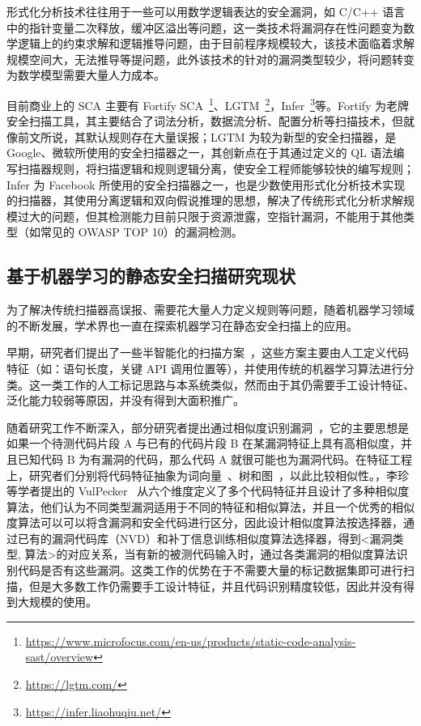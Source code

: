 形式化分析技术往往用于一些可以用数学逻辑表达的安全漏洞，如 C/C++ 语言中的指针变量二次释放，缓冲区溢出等问题，这一类技术将漏洞存在性问题变为数学逻辑上的约束求解和逻辑推导问题，由于目前程序规模较大，该技术面临着求解规模空间大，无法推导等提问题，此外该技术的针对的漏洞类型较少，将问题转变为数学模型需要大量人力成本。

目前商业上的 SCA 主要有 Fortify SCA~\footnote{\url{https://www.microfocus.com/en-us/products/static-code-analysis-sast/overview}}、LGTM~\footnote{\url{https://lgtm.com/}}，Infer~\footnote{\url{https://infer.liaohuqiu.net/}}等。Fortify 为老牌安全扫描工具，其主要结合了词法分析，数据流分析、配置分析等扫描技术，但就像前文所说，其默认规则存在大量误报；LGTM 为较为新型的安全扫描器，是 Google、微软所使用的安全扫描器之一，其创新点在于其通过定义的 QL 语法编写扫描器规则，将扫描逻辑和规则逻辑分离，使安全工程师能够较快的编写规则；Infer 为 Facebook 所使用的安全扫描器之一，也是少数使用形式化分析技术实现的扫描器，其使用分离逻辑和双向假说推理的思想，解决了传统形式化分析求解规模过大的问题，但其检测能力目前只限于资源泄露，空指针漏洞，不能用于其他类型（如常见的 OWASP TOP 10）的漏洞检测。\\

\subsection{基于机器学习的静态安全扫描研究现状}

为了解决传统扫描器高误报、需要花大量人力定义规则等问题，随着机器学习领域的不断发展，学术界也一直在探索机器学习在静态安全扫描上的应用。

早期，研究者们提出了一些半智能化的扫描方案~\cite{aletheia,zranking,ayukselCaseStudy}，这些方案主要由人工定义代码特征（如：语句长度，关键 API 调用位置等），并使用传统的机器学习算法进行分类。这一类工作的人工标记思路与本系统类似，然而由于其仍需要手工设计特征、泛化能力较弱等原因，并没有得到大面积推广。

随着研究工作不断深入，部分研究者提出通过相似度识别漏洞~\cite{vuddy,li2016vulpecker}，它的主要思想是如果一个待测代码片段 A 与已有的代码片段 B 在某漏洞特征上具有高相似度，并且已知代码 B 为有漏洞的代码，那么代码 A 就很可能也为漏洞代码。在特征工程上，研究者们分别将代码特征抽象为词向量~\cite{vuddy}、树和图~\cite{simtree}，以此比较相似性。，李珍等学者提出的 VulPecker~\cite{li2016vulpecker} 从六个维度定义了多个代码特征并且设计了多种相似度算法，他们认为不同类型漏洞适用于不同的特征和相似算法，并且一个优秀的相似度算法可以可以将含漏洞和安全代码进行区分，因此设计相似度算法按选择器，通过已有的漏洞代码库（NVD）和补丁信息训练相似度算法选择器，得到<漏洞类型, 算法>的对应关系，当有新的被测代码输入时，通过各类漏洞的相似度算法识别代码是否有这些漏洞。这类工作的优势在于不需要大量的标记数据集即可进行扫描，但是大多数工作仍需要手工设计特征，并且代码识别精度较低，因此并没有得到大规模的使用。

